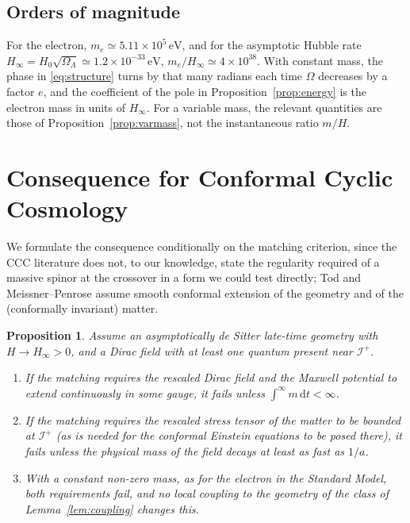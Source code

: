 \documentclass[11pt,a4paper]{article}
\newtheorem{proposition}{Proposition}
\theoremstyle{definition}
\newcommand{\scri}{\mathscr{I}^{+}}
\newcommand{\dd}{\mathrm{d}}
\begin{document}
\subsection{Orders of magnitude}

For the electron, $m_{e}\simeq5.11\times10^{5}\,\mathrm{eV}$, and for the asymptotic Hubble rate $H_{\infty}=H_{0}\sqrt{\Omega_{\Lambda}}\simeq1.2\times10^{-33}\,\mathrm{eV}$, $m_{e}/H_{\infty}\simeq4\times10^{38}$. With constant mass, the phase in \eqref{eq:structure} turns by that many radians each time $\Omega$ decreases by a factor $e$, and the coefficient of the pole in Proposition~\ref{prop:energy} is the electron mass in units of $H_{\infty}$. For a variable mass, the relevant quantities are those of Proposition~\ref{prop:varmass}, not the instantaneous ratio $m/H$.

\section{Consequence for Conformal Cyclic Cosmology}
\label{sec:ccc}

We formulate the consequence conditionally on the matching criterion, since the CCC literature does not, to our knowledge, state the regularity required of a massive spinor at the crossover in a form we could test directly; Tod \cite{Tod2013} and Meissner--Penrose \cite{MeissnerPenrose2025} assume smooth conformal extension of the geometry and of the (conformally invariant) matter.

\begin{proposition}
\label{prop:ccc}
Assume an asymptotically de Sitter late-time geometry with $H\to H_{\infty}>0$, and a Dirac field with at least one quantum present near $\scri$.
\begin{enumerate}[label=(\alph*)]
\item If the matching requires the rescaled Dirac field and the Maxwell potential to extend continuously in some gauge, it fails unless $\int^{\infty}m\,\dd t<\infty$.
\item If the matching requires the rescaled stress tensor of the matter to be bounded at $\scri$ (as is needed for the conformal Einstein equations to be posed there), it fails unless the physical mass of the field decays at least as fast as $1/a$.
\item With a constant non-zero mass, as for the electron in the Standard Model, both requirements fail, and no local coupling to the geometry of the class of Lemma~\ref{lem:coupling} changes this.
\end{enumerate}
\end{proposition}
\end{document}
